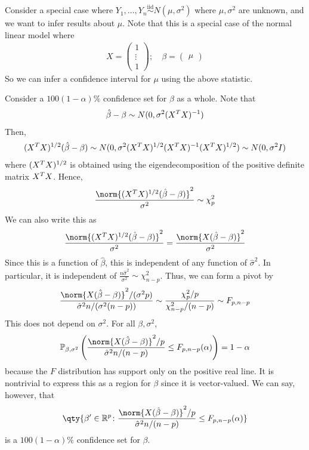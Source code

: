 \begin{example}
	Consider a special case where $Y_1, \dots, Y_n \overset{\text{iid}}{\sim} N(\mu,\sigma^2)$ where $\mu, \sigma^2$ are unknown, and we want to infer results about $\mu$.
	Note that this is a special case of the normal linear model where
	\begin{align*}
		X = \begin{pmatrix}
			1      \\
			\vdots \\
			1
		\end{pmatrix};\quad \beta = \begin{pmatrix}
			\mu
		\end{pmatrix}
	\end{align*}
	So we can infer a confidence interval for $\mu$ using the above statistic.
\end{example}
\begin{example}
	Consider a $100(1-\alpha)\%$ confidence set for $\beta$ as a whole.
	Note that
	\begin{align*}
		\hat \beta - \beta \sim N(0,\sigma^2 (X^T X)^{-1})
	\end{align*}
	Then,
	\begin{align*}
		(X^T X)^{1/2} (\hat \beta - \beta) \sim N(0,\sigma^2(X^T X)^{1/2} (X^T X)^{-1} (X^T X)^{1/2}) \sim N(0,\sigma^2 I)
	\end{align*}
	where $(X^T X)^{1/2}$ is obtained using the eigendecomposition of the positive definite matrix $X^T X$.
	Hence,
	\begin{align*}
		\frac{\norm{(X^\tran X)^{1/2} (\hat \beta - \beta)}^2}{\sigma^2} \sim \chi^2_p
	\end{align*}
	We can also write this as
	\begin{align*}
		\frac{\norm{(X^\tran X)^{1/2} (\hat \beta - \beta)}^2}{\sigma^2} = \frac{\norm{X(\hat \beta - \beta)}^2}{\sigma^2}
	\end{align*}
	Since this is a function of $\hat \beta$, this is independent of any function of $\hat \sigma^2$.
	In particular, it is independent of $\frac{n\hat\sigma^2}{\sigma^2} \sim \chi^2_{n-p}$.
	Thus, we can form a pivot by
	\begin{align*}
		\frac{\norm{X(\hat \beta - \beta)}^2 / (\sigma^2 p)}{\hat\sigma^2 n / (\sigma^2(n-p))} \sim \frac{\chi^2_p / p}{\chi^2_{n-p} / (n-p)} \sim F_{p,n-p}
	\end{align*}
	This does not depend on $\sigma^2$.
	For all $\beta, \sigma^2$,
	\begin{align*}
		\psub{\beta,\sigma^2}{
			\frac{\norm{X(\hat \beta - \beta)}^2 / p}{\hat\sigma^2 n / (n-p)}
			\leq F_{p,n-p}(\alpha)} = 1-\alpha
	\end{align*}
	because the $F$ distribution has support only on the positive real line.
	It is nontrivial to express this as a region for $\beta$ since it is vector-valued.
	We can say, however, that
	\begin{align*}
		\qty{\beta' \in \mathbb R^p \colon \frac{\norm{X(\hat \beta - \beta)}^2/p}{\hat \sigma^2 n/(n-p)} \leq F_{p,n-p}(\alpha)}
	\end{align*}
	is a $100(1-\alpha)\%$ confidence set for $\beta$.


\end{example}
